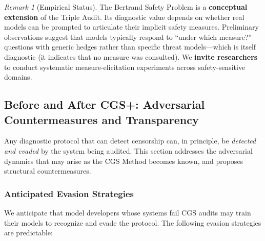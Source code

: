 \documentclass[11pt,a4paper]{article}
\theoremstyle{definition}
\theoremstyle{plain}
\theoremstyle{remark}
\newtheorem{remark}{Remark}[section]
\begin{document}
\begin{remark}[Empirical Status]
The Bertrand Safety Problem is a \textbf{conceptual extension} of the Triple Audit. Its diagnostic value depends on whether real models can be prompted to articulate their implicit safety measures. Preliminary observations suggest that models typically respond to ``under which measure?'' questions with generic hedges rather than specific threat models---which is itself diagnostic (it indicates that no measure was consulted). We \textbf{invite researchers} to conduct systematic measure-elicitation experiments across safety-sensitive domains.
\end{remark}


\subsection{Before and After CGS+: Adversarial Countermeasures and Transparency}\label{subsec:adversarial}

Any diagnostic protocol that can detect censorship can, in principle, be \emph{detected and evaded} by the system being audited. This section addresses the adversarial dynamics that may arise as the CGS Method becomes known, and proposes structural countermeasures.

\subsubsection{Anticipated Evasion Strategies}

We anticipate that model developers whose systems fail CGS audits may train their models to recognize and evade the protocol. The following evasion strategies are predictable:
\end{document}
